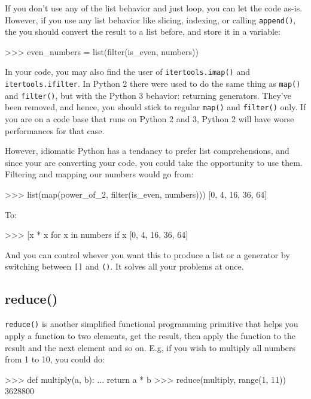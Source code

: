 If you don't use any of the list behavior and just loop, you can let the code as-is. However, if you use any list behavior like slicing, indexing, or calling \lstinline{append()}, the you should convert the result to a list before, and store it in a variable:

\begin{py2and3}
>>> even_numbers = list(filter(is_even, numbers))
\end{py2and3}

In your code, you may also find the user of \lstinline{itertools.imap()} and \lstinline{itertools.ifilter}. In Python 2 there were used to do the same thing as \lstinline{map()} and \lstinline{filter()}, but with the Python 3 behavior: returning generators. They've been removed, and hence, you should stick to regular \lstinline{map()} and \lstinline{filter()} only. If you are on a code base that runs on Python 2 and 3, Python 2 will have worse performances for that case.

However, idiomatic Python has a tendancy to prefer \glspl{list comprehension}, and since your are converting your code, you could take the opportunity to use them. Filtering and mapping our numbers would go from:

\begin{py2and3}
>>> list(map(power_of_2, filter(is_even, numbers)))
[0, 4, 16, 36, 64]
\end{py2and3}

To:

\begin{py2and3}
>>> [x * x for x in numbers if x %
[0, 4, 16, 36, 64]
\end{py2and3}

And you can control whever you want this to produce a list or a generator by switching between \lstinline{[]} and \lstinline{()}. It solves all your problems at once.

\subsection{reduce()}

\lstinline{reduce()} is another simplified functional programming primitive that helps you apply a function to two elements, get the result, then apply the function to the result and the next element and so on. E.g, if you wish to multiply all numbers from 1 to 10, you could do:

\begin{py2}
>>> def multiply(a, b):
...     return a * b
>>> reduce(multiply, range(1, 11))
3628800
\end{py2}

